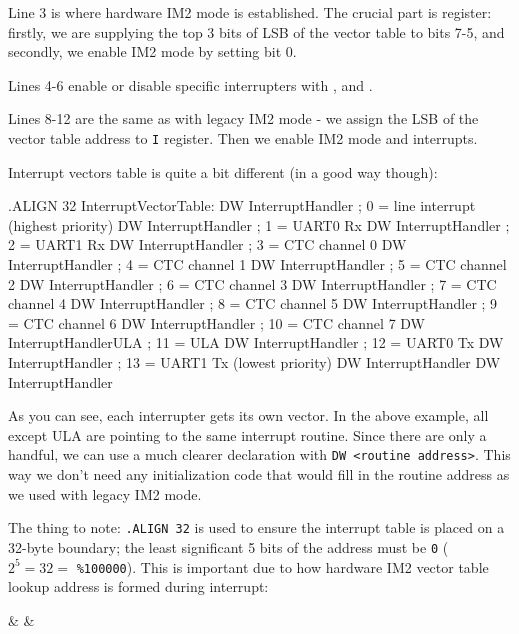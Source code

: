 Line 3 is where hardware IM2 mode is established. The crucial part is  register: firstly, we are supplying the top 3 bits of LSB of the vector table to bits 7-5, and secondly, we enable IM2 mode by setting bit 0.

Lines 4-6 enable or disable specific interrupters with ,  and .

Lines 8-12 are the same as with legacy IM2 mode - we assign the LSB of the vector table address to {\tt I} register. Then we enable IM2 mode and interrupts.

Interrupt vectors table is quite a bit different (in a good way though):

\begin{tcblisting}{}
    .ALIGN 32
InterruptVectorTable:
    DW InterruptHandler        ; 0 = line interrupt (highest priority)
    DW InterruptHandler        ; 1 = UART0 Rx
    DW InterruptHandler        ; 2 = UART1 Rx
    DW InterruptHandler        ; 3 = CTC channel 0
    DW InterruptHandler        ; 4 = CTC channel 1
    DW InterruptHandler        ; 5 = CTC channel 2
    DW InterruptHandler        ; 6 = CTC channel 3
    DW InterruptHandler        ; 7 = CTC channel 4
    DW InterruptHandler        ; 8 = CTC channel 5
    DW InterruptHandler        ; 9 = CTC channel 6
    DW InterruptHandler        ; 10 = CTC channel 7
    DW InterruptHandlerULA     ; 11 = ULA
    DW InterruptHandler        ; 12 = UART0 Tx
    DW InterruptHandler        ; 13 = UART1 Tx (lowest priority)
    DW InterruptHandler
    DW InterruptHandler
\end{tcblisting}

As you can see, each interrupter gets its own vector. In the above example, all except ULA are pointing to the same interrupt routine. Since there are only a handful, we can use a much clearer declaration with {\tt DW <routine address>}. This way we don't need any initialization code that would fill in the routine address as we used with legacy IM2 mode.

The thing to note: {\tt .ALIGN 32} is used to ensure the interrupt table is placed on a 32-byte boundary; the least significant 5 bits of the address must be {\tt 0} ($2^5=32=$ {\tt \%100000}). This is important due to how hardware IM2 vector table lookup address is formed during interrupt:

\begin{BitTableWord}
	 &  &  \\
\end{BitTableWord}

